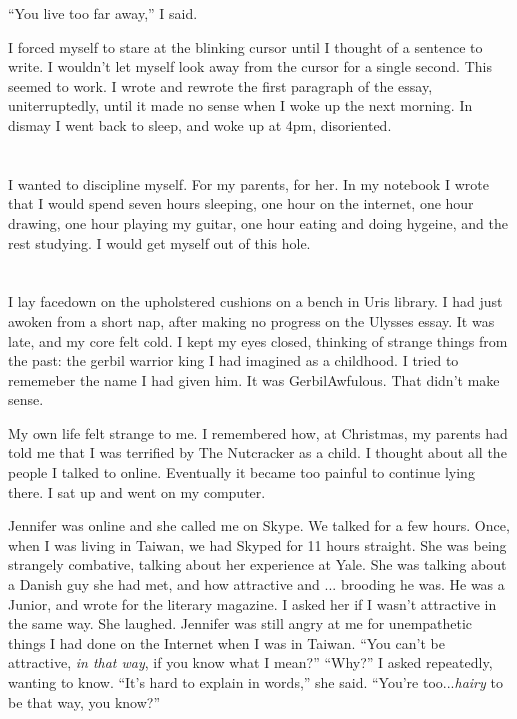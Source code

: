 ``You live too far away,'' I said.  

I forced myself to stare at the blinking cursor until I thought of a sentence to
write.  I wouldn't let myself look away from the cursor for a single second.
This seemed to work.  I wrote and rewrote the first paragraph of the essay,
uniterruptedly, until it made no sense when I woke up the next morning.  In
dismay I went back to sleep, and woke up at 4pm, disoriented.  

\section{}

I wanted to discipline myself.  For my parents, for her.  In my notebook I wrote
that I would spend seven hours sleeping, one hour on the internet, one hour
drawing, one hour playing my guitar, one hour eating and doing hygeine, and the
rest studying.  I would get myself out of this hole.  

\section{}

I lay facedown on the upholstered cushions on a bench in Uris library.  I had
just awoken from a short nap, after making no progress on the Ulysses essay.  It
was late, and my core felt cold.  I kept my eyes closed, thinking of strange
things from the past: the gerbil warrior king I had imagined as a childhood.  I
tried to rememeber the name I had given him.  It was GerbilAwfulous.  That
didn't make sense.  

My own life felt strange to me.  I remembered how, at Christmas, my parents had
told me that I was terrified by The Nutcracker as a child.  I thought about all
the people I talked to online.  Eventually it became too painful to continue
lying there.  I sat up and went on my computer. 

Jennifer was online and she called me on Skype.  We talked for a few hours.
Once, when I was living in Taiwan, we had Skyped for 11 hours straight.  She was
being strangely combative, talking about her experience at Yale.  She was
talking about a Danish guy she had met, and how attractive and ... brooding he
was.  He was a Junior, and wrote for the literary magazine.  I asked her if I
wasn't attractive in the same way.  She laughed.  Jennifer was still angry at me
for unempathetic things I had done on the Internet when I was in Taiwan.  ``You
can't be attractive, \textit{in that way}, if you know what I mean?'' ``Why?'' I
asked repeatedly, wanting to know.  ``It's hard to explain in words,'' she said.
``You're too...\textit{hairy} to be that way, you know?''

